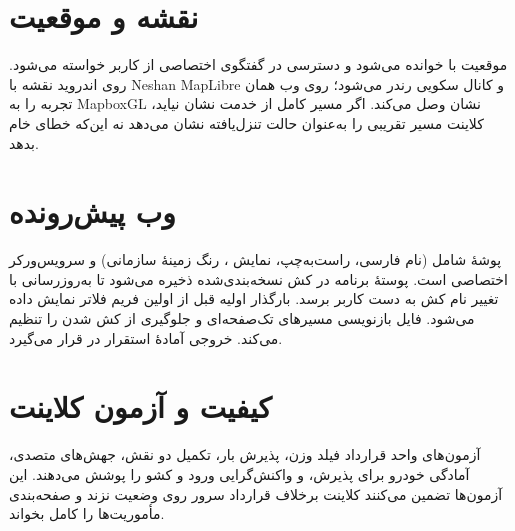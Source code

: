 \section{نقشه و موقعیت}

موقعیت با  خوانده می‌شود و دسترسی در گفتگوی اختصاصی از کاربر خواسته می‌شود. روی اندروید نقشه با \textenglish{Neshan MapLibre} و کانال سکویی رندر می‌شود؛ روی وب  همان تجربه را به \textenglish{MapboxGL} نشان وصل می‌کند. اگر مسیر کامل از خدمت نشان نیاید، کلاینت مسیر تقریبی را به‌عنوان حالت تنزل‌یافته نشان می‌دهد نه این‌که خطای خام بدهد.

\section{وب پیش‌رونده}

پوشهٔ  شامل  (نام فارسی، راست‌به‌چپ، نمایش ، رنگ زمینهٔ سازمانی) و سرویس‌ورکر اختصاصی  است. پوستهٔ برنامه در کش نسخه‌بندی‌شده ذخیره می‌شود تا به‌روزرسانی با تغییر نام کش به دست کاربر برسد. بارگذار اولیه قبل از اولین فریم فلاتر نمایش داده می‌شود. فایل  بازنویسی مسیرهای تک‌صفحه‌ای و جلوگیری از کش شدن  را تنظیم می‌کند. خروجی آمادهٔ استقرار در  قرار می‌گیرد.

\section{کیفیت و آزمون کلاینت}

آزمون‌های واحد قرارداد فیلد وزن، پذیرش بار، تکمیل دو نقش، جهش‌های متصدی، آمادگی خودرو برای پذیرش، و واکنش‌گرایی ورود و کشو را پوشش می‌دهند. این آزمون‌ها تضمین می‌کنند کلاینت برخلاف قرارداد سرور  روی وضعیت  نزند و صفحه‌بندی مأموریت‌ها را کامل بخواند.
